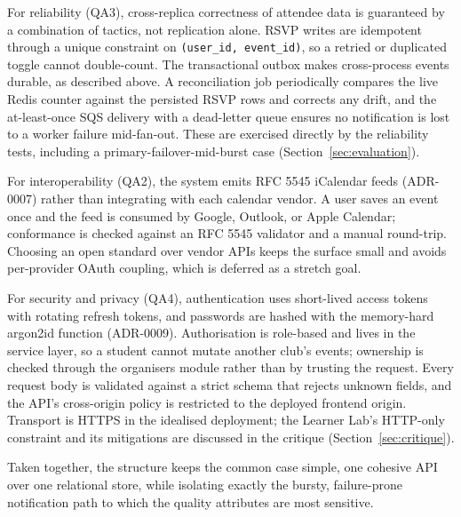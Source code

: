 For reliability (QA3), cross-replica correctness of attendee data is guaranteed by a combination of tactics, not replication alone. RSVP writes are idempotent through a unique constraint on \texttt{(user\_id, event\_id)}, so a retried or duplicated toggle cannot double-count. The transactional outbox makes cross-process events durable, as described above. A reconciliation job periodically compares the live Redis counter against the persisted RSVP rows and corrects any drift, and the at-least-once SQS delivery with a dead-letter queue ensures no notification is lost to a worker failure mid-fan-out. These are exercised directly by the reliability tests, including a primary-failover-mid-burst case (Section~\ref{sec:evaluation}).

For interoperability (QA2), the system emits RFC 5545 iCalendar feeds (ADR-0007) rather than integrating with each calendar vendor. A user saves an event once and the feed is consumed by Google, Outlook, or Apple Calendar; conformance is checked against an RFC 5545 validator and a manual round-trip. Choosing an open standard over vendor APIs keeps the surface small and avoids per-provider OAuth coupling, which is deferred as a stretch goal.

For security and privacy (QA4), authentication uses short-lived access tokens with rotating refresh tokens, and passwords are hashed with the memory-hard argon2id function (ADR-0009). Authorisation is role-based and lives in the service layer, so a student cannot mutate another club's events; ownership is checked through the organisers module rather than by trusting the request. Every request body is validated against a strict schema that rejects unknown fields, and the API's cross-origin policy is restricted to the deployed frontend origin. Transport is HTTPS in the idealised deployment; the Learner Lab's HTTP-only constraint and its mitigations are discussed in the critique (Section~\ref{sec:critique}).

Taken together, the structure keeps the common case simple, one cohesive API over one relational store, while isolating exactly the bursty, failure-prone notification path to which the quality attributes are most sensitive.